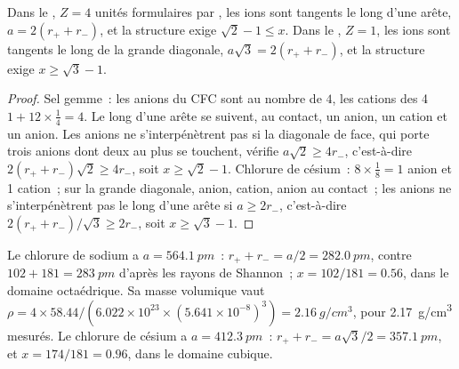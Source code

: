 \begin{proposition}\label{prop:b1:crystals-ionic-covalent:nacl-cscl}
Dans le , $Z = 4$ unités formulaires par , les ions
sont tangents le long d'une arête, $a = 2(r_+ + r_-)$, et la structure
exige $\sqrt2 - 1
\le x$. Dans le , $Z = 1$, les ions sont tangents
le long de la grande diagonale, $a\sqrt3 = 2(r_+ + r_-)$, et la
structure exige $x \ge \sqrt3 - 1$.
\end{proposition}

\begin{proof}
Sel gemme~: les anions du  CFC sont au nombre de $4$, les cations
des 4  $1 + 12 \times \frac14 = 4$. Le long d'une
arête se suivent, au contact, un anion, un cation et un anion. Les
anions ne s'interpénètrent pas si la diagonale de face, qui porte trois
anions dont deux au plus se touchent, vérifie $a\sqrt2 \ge 4r_-$,
c'est-à-dire $2(r_+ + r_-)\sqrt2 \ge
4r_-$, soit $x \ge \sqrt2 - 1$. Chlorure de césium~: $8 \times \frac18 = 1$
anion et 1 cation~; sur la grande diagonale, anion, cation, anion au
contact~; les anions ne s'interpénètrent pas le long d'une arête si
$a \ge 2r_-$, c'est-à-dire
$2(r_+ + r_-)/\sqrt3 \ge 2r_-$, soit $x \ge \sqrt3 - 1$.
\end{proof}

\begin{example}\label{ex:b1:crystals-ionic-covalent:nacl}
Le chlorure de sodium a $a = \qty{564.1}{pm}$~: $r_+ + r_- = a/2 =
\qty{282.0}{pm}$, contre $102 + 181 = \qty{283}{pm}$ d'après les rayons
de Shannon~; $x = 102/181 = 0.56$, dans le domaine octaédrique. Sa masse
volumique vaut
$\rho = 4 \times 58.44/(6.022 \times 10^{23} \times (5.641 \times
10^{-8})^3) = \qty{2.16}{g/cm^3}$, pour \qty{2.17}{g/cm^3} mesurés. Le
chlorure de césium a $a = \qty{412.3}{pm}$~: $r_+ + r_- = a\sqrt3/2 =
\qty{357.1}{pm}$, et $x = 174/181 = 0.96$, dans le domaine cubique.
\end{example}

